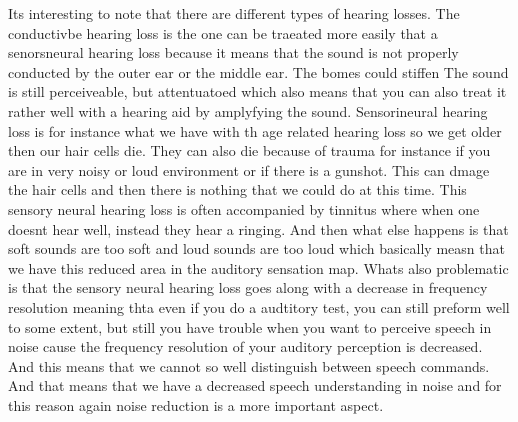 Its interesting to note that there are different types of hearing losses.  The conductivbe hearing loss is the one can be traeated more easily that a senorsneural hearing loss  because it means that the sound is not properly conducted by the outer ear or the middle ear. The bomes could stiffen The sound is still perceiveable, but attentuatoed which also means that you can also treat it rather well with a hearing aid by amplyfying the sound. Sensorineural hearing loss is for instance what we have with th age related hearing loss so we get older then our hair cells die. They can also die because of trauma for instance if you are in very noisy or loud environment or if there is a gunshot. This can dmage the hair cells and then there is nothing that we could do at this time.  This sensory neural hearing loss is often accompanied by tinnitus where when one doesnt hear well, instead they hear a ringing. And then what else happens is that soft sounds are too soft and loud sounds are too loud which basically measn that we have this reduced area in the auditory sensation map. Whats also problematic is that the sensory neural hearing loss goes along with a decrease in frequency resolution meaning thta even if you do a audtitory test, you can still preform well to some extent, but still you have trouble when you want to perceive speech in noise cause the frequency resolution of your auditory perception is decreased. And this means that we cannot so well distinguish between speech commands. And that means that we have a decreased speech understanding in noise and for this reason again noise reduction is a more important aspect.

